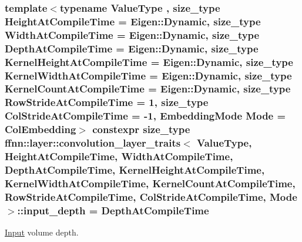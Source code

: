 \hypertarget{structffnn_1_1layer_1_1convolution__layer__traits_a508a1594a6f77f6f536744cd40e2b9fd}{
\subsubsection[{input\-\_\-depth}]{\setlength{\rightskip}{0pt plus 5cm}template$<$typename Value\-Type , size\-\_\-type Height\-At\-Compile\-Time = Eigen\-::\-Dynamic, size\-\_\-type Width\-At\-Compile\-Time = Eigen\-::\-Dynamic, size\-\_\-type Depth\-At\-Compile\-Time = Eigen\-::\-Dynamic, size\-\_\-type Kernel\-Height\-At\-Compile\-Time = Eigen\-::\-Dynamic, size\-\_\-type Kernel\-Width\-At\-Compile\-Time = Eigen\-::\-Dynamic, size\-\_\-type Kernel\-Count\-At\-Compile\-Time = Eigen\-::\-Dynamic, size\-\_\-type Row\-Stride\-At\-Compile\-Time = 1, size\-\_\-type Col\-Stride\-At\-Compile\-Time = -\/1, Embedding\-Mode Mode = Col\-Embedding$>$ constexpr {\bf size\-\_\-type} {\bf ffnn\-::layer\-::convolution\-\_\-layer\-\_\-traits}$<$ Value\-Type, Height\-At\-Compile\-Time, Width\-At\-Compile\-Time, Depth\-At\-Compile\-Time, Kernel\-Height\-At\-Compile\-Time, Kernel\-Width\-At\-Compile\-Time, Kernel\-Count\-At\-Compile\-Time, Row\-Stride\-At\-Compile\-Time, Col\-Stride\-At\-Compile\-Time, Mode $>$\-::input\-\_\-depth = Depth\-At\-Compile\-Time\hspace{0.3cm}{\ttfamily [static]}}}\label{structffnn_1_1layer_1_1convolution__layer__traits_a508a1594a6f77f6f536744cd40e2b9fd}


\hyperlink{classffnn_1_1layer_1_1_input}{Input} volume depth. 

